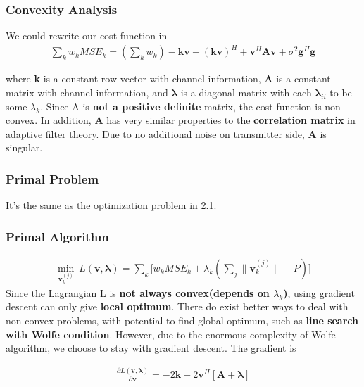 \documentclass[11pt, oneside]{article}   	%
\begin{document}
\subsubsection{Convexity Analysis}

We could rewrite our cost function in
\begin{align*}
\displaystyle\sum_{k} 	w_k	MSE_{k}	=  (\displaystyle\sum_{k} w_k)-\textbf{kv}-(\textbf{kv})^{H}+\textbf{v}^{H}\textbf{A}\textbf{v}+ \sigma^{2} \textbf{g}^{H} \textbf{g}
\end{align*}

where \textbf{k} is a constant row vector with channel information, \textbf{A} is a constant matrix with channel information, and $\pmb{\lambda}$ is a diagonal matrix with each $\pmb{\lambda}_{ii}$ to be some $\lambda_{k}$. Since A is \textbf{not a positive definite} matrix, the cost function is non-convex. In addition, \textbf{A} has very similar properties to the \textbf{correlation matrix} in adaptive filter theory. Due to no additional noise on transmitter side, \textbf{A} is singular.




\subsubsection{Primal Problem}
It's the same as the optimization problem in 2.1. 

\subsubsection{Primal Algorithm}
\begin{align*}
\min_{\textbf{v}_{k}^{(j)}}\
L( \textbf{v}, \pmb{\lambda} )=\displaystyle\sum_{k} 	\bigg[w_k	MSE_{k}	+	\lambda_{k}	(\displaystyle\sum_{j}	\|	\textbf{v}^{(j)}_{k}	\|	-P	)	\bigg]
\end{align*}
Since the Lagrangian L is \textbf{not always convex(depends on $\lambda_{k}$)}, using gradient descent can only give \textbf{local optimum}. There do exist better ways to deal with non-convex problems, with potential to find global optimum, such as  \textbf{line search with Wolfe condition}. However, due to the enormous complexity of Wolfe algorithm, we choose to stay with gradient descent. The gradient is

\begin{align*}
\frac{\partial L( \textbf{v}, \pmb{\lambda} )}{\partial \textbf{v}} = -2\textbf{k}+2\textbf{v}^{H}[\textbf{A}+\pmb{\lambda}]
\end{align*}
\end{document}
